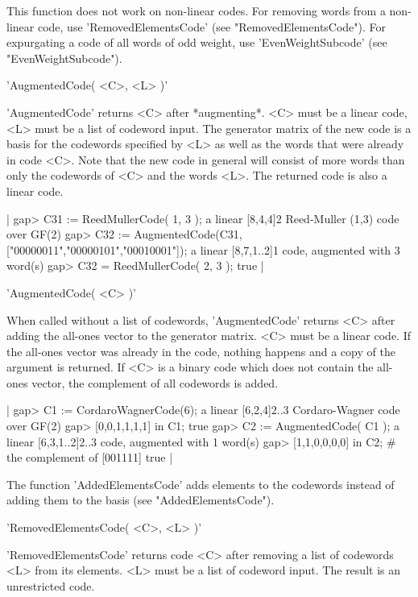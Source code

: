 This function does not work on non-linear codes.  For removing words from
a        non-linear      code,     use    'RemovedElementsCode'      (see
"RemovedElementsCode").  For  expurgating  a  code of  all words   of odd
weight, use 'EvenWeightSubcode' (see "EvenWeightSubcode").


'AugmentedCode( <C>, <L> )'

'AugmentedCode'  returns <C> after  *augmenting*.  <C>  must be a  linear
code, <L> must be a list  of codeword input.  The generator matrix of the
new  code is a basis  for the codewords specified by  <L> as  well as the
words that were already in  code <C>. Note  that the new code in  general
will consist of  more words than only the  codewords of <C> and the words
<L>. The returned code is also a linear code.

|    gap> C31 := ReedMullerCode( 1, 3 );
    a linear [8,4,4]2 Reed-Muller (1,3) code over GF(2)
    gap> C32 := AugmentedCode(C31,["00000011","00000101","00010001"]);
    a linear [8,7,1..2]1 code, augmented with 3 word(s)
    gap> C32 = ReedMullerCode( 2, 3 );
    true |

'AugmentedCode( <C> )'

When  called without a  list   of codewords, 'AugmentedCode' returns  <C>
after adding the all-ones vector  to the generator  matrix. <C> must be a
linear code.   If the  all-ones vector  was already in  the code, nothing
happens and a copy of the argument  is returned. If  <C> is a binary code
which does  not   contain the all-ones  vector,   the complement  of  all
codewords is added.

|    gap> C1 := CordaroWagnerCode(6);
    a linear [6,2,4]2..3 Cordaro-Wagner code over GF(2)
    gap> [0,0,1,1,1,1] in C1;
    true
    gap> C2 := AugmentedCode( C1 );
    a linear [6,3,1..2]2..3 code, augmented with 1 word(s)
    gap> [1,1,0,0,0,0] in C2;    # the complement of [001111]
    true |

The function  'AddedElementsCode' adds elements  to the codewords instead
of adding them to the basis (see "AddedElementsCode").


'RemovedElementsCode( <C>, <L> )'

'RemovedElementsCode' returns code <C> after removing a list of codewords
<L> from its elements. <L> must be a  list of codeword input.  The result
is an unrestricted code.

